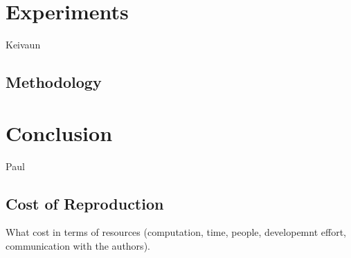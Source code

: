 \documentclass[10pt,twocolumn,letterpaper]{article}
\begin{document}

\section{Experiments}
Keivaun
\subsection{Methodology}

\section{Conclusion}
\label{sec:conclusion}
Paul

\subsection{Cost of Reproduction}
What cost in terms of resources (computation, time, people, developemnt effort, communication with the authors).

{\small


}
\end{document}
